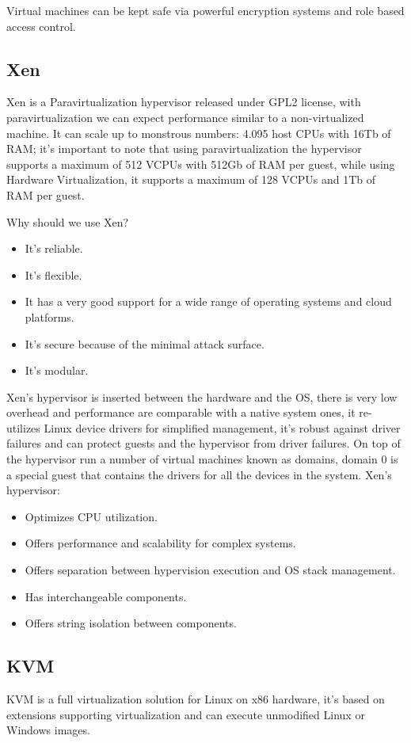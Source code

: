 Virtual machines can be kept safe via powerful encryption systems and role based access control.
\subsection{Xen}
Xen is a Paravirtualization hypervisor released under GPL2 license, with paravirtualization we can expect performance similar to a non-virtualized machine. It can scale up to monstrous numbers: 4.095 host CPUs with 16Tb of RAM; it's important to note that using paravirtualization the hypervisor supports a maximum of 512 VCPUs with 512Gb of RAM per guest, while using Hardware Virtualization, it supports a maximum of 128 VCPUs and 1Tb of RAM per guest.

Why should we use Xen?
\begin{itemize}
    \item It's reliable.
    \item It's flexible.
    \item It has a very good support for a wide range of operating systems and cloud platforms.
    \item It's secure because of the minimal attack surface.
    \item It's modular.
\end{itemize}
Xen's hypervisor is inserted between the hardware and the OS, there is very low overhead and performance are comparable with a native system ones, it re-utilizes Linux device drivers for simplified management, it's robust against driver failures and can protect guests and the hypervisor from driver failures. On top of the hypervisor run a number of virtual machines known as domains, domain 0 is a special guest that contains the drivers for all the devices in the system. Xen's hypervisor:
\begin{itemize}
    \item Optimizes CPU utilization.
    \item Offers performance and scalability for complex systems.
    \item Offers separation between hypervision execution and OS stack management.
    \item Has interchangeable components.
    \item Offers string isolation between components.
\end{itemize}
\subsection{KVM}
KVM is a full virtualization solution for Linux on x86 hardware, it's based on extensions supporting virtualization and can execute unmodified Linux or Windows images.

